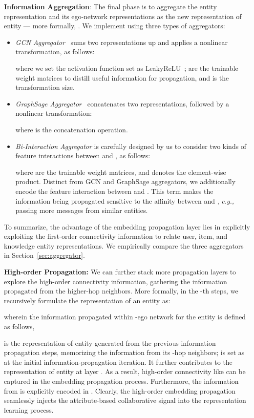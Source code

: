 \documentclass[sigconf]{acmart}
\newcommand{\eg}{\emph{e.g., }}
\theoremstyle{definition}
\begin{document}
\vspace{5px}
\noindent\textbf{Information Aggregation}:
The final phase is to aggregate the entity representation  and its ego-network representations  as the new representation of entity  --- more formally, .
We implement  using three types of aggregators:
\begin{itemize}[leftmargin=*]
    \item \emph{GCN Aggregator}~\cite{GCN} sums two representations up and applies a nonlinear transformation, as follows:
        
        where we set the activation function set as LeakyReLU~\cite{Nonlinear};  are the trainable weight matrices to distill useful information for propagation, and  is the transformation size.
    
    \item \emph{GraphSage Aggregator}~\cite{GraphSage} concatenates two representations, followed by a nonlinear transformation:
        
        where  is the concatenation operation.
        
    \item \emph{Bi-Interaction Aggregator} is carefully designed by us to consider two kinds of feature interactions between  and , as follows:
        
        where  are the trainable weight matrices, and  denotes the element-wise product. Distinct from GCN and GraphSage aggregators, we additionally encode the feature interaction between  and . This term makes the information being propagated sensitive to the affinity between  and , \eg passing more messages from similar entities.
\end{itemize}
To summarize, the advantage of the embedding propagation layer lies in explicitly exploiting the first-order connectivity information to relate user, item, and knowledge entity representations.
We empirically compare the three aggregators in Section~\ref{sec:aggregator}.

\vspace{5px}
\noindent\textbf{High-order Propagation:}
We can further stack more propagation layers to explore the high-order connectivity information, gathering the information propagated from the higher-hop neighbors.
More formally, in the -th steps, we recursively formulate the representation of an entity as:

wherein the information propagated within -ego network for the entity  is defined as follows,

 is the representation of entity  generated from the previous information propagation steps, memorizing the information from its -hop neighbors;
 is set as  at the initial information-propagation iteration.
It further contributes to the representation of entity  at layer .
As a result, high-order connectivity like  can be captured in the embedding propagation process.
Furthermore, the information from  is explicitly encoded in .
Clearly, the high-order embedding propagation seamlessly injects the attribute-based collaborative signal into the representation learning process.
\end{document}
